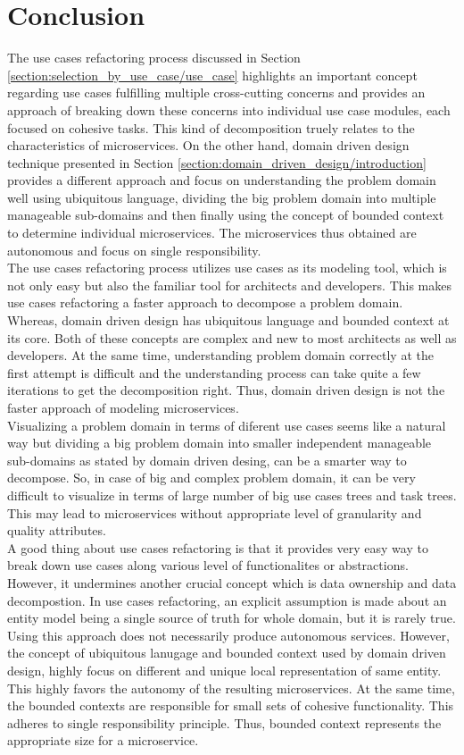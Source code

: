 \section{Conclusion}\label{section:modeling_microservices/conclusion}
The use cases refactoring process discussed in Section \ref{section:selection_by_use_case/use_case} highlights an important concept regarding use cases fulfilling multiple cross-cutting concerns and provides an approach of breaking down these concerns into individual use case modules, each focused on cohesive tasks. This kind of decomposition truely relates to the characteristics of microservices. On the other hand, domain driven design technique presented in Section \ref{section:domain_driven_design/introduction} provides a different approach and focus on understanding the problem domain well using ubiquitous language, dividing the big problem domain into multiple manageable sub-domains and then finally using the concept of bounded context to determine individual microservices. The microservices thus obtained are autonomous and focus on single responsibility.\\
The use cases refactoring process utilizes use cases as its modeling tool, which is not only easy but also the familiar tool for architects and developers. This makes use cases refactoring a faster approach to decompose a problem domain. Whereas, domain driven design has ubiquitous language and bounded context at its core. Both of these concepts are complex and new to most architects as well as developers. At the same time, understanding problem domain correctly at the first attempt is difficult and the understanding process can take quite a few iterations to get the decomposition right. Thus, domain driven design is not the faster approach of modeling microservices.\\
Visualizing a problem domain in terms of diferent use cases seems like a natural way but dividing a big problem domain into smaller independent manageable sub-domains as stated by domain driven desing, can be a smarter way to decompose. So, in case of big and complex problem domain, it can be very difficult to visualize in terms of large number of big use cases trees and task trees. This may lead to microservices without appropriate level of granularity and quality attributes.\\
A good thing about use cases refactoring is that it provides very easy way to break down use cases along various level of functionalites or abstractions. However, it undermines another crucial concept which is data ownership and data decompostion. In use cases refactoring, an explicit assumption is made about an entity model being a single source of truth for whole domain, but it is rarely true. Using this approach does not necessarily produce autonomous services. However, the concept of ubiquitous lanugage and bounded context used by domain driven design, highly focus on different and unique local representation of same entity. This highly favors the autonomy of the resulting microservices. At the same time, the bounded contexts are responsible for small sets of cohesive functionality. This adheres to single responsibility principle. Thus, bounded context represents the appropriate size for a microservice.

